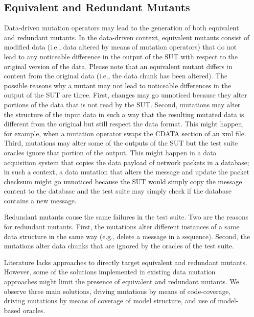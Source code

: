 
\subsection{Equivalent and Redundant Mutants}
\label{sec:dataequivalent}

Data-driven mutation operators may lead to the generation of both equivalent and redundant mutants.
In the data-driven context, equivalent mutants consist of modified data (i.e., data altered by means of mutation operators) that do not lead to any noticeable difference in the output of the SUT with respect to the original version of the data.
Please note that an equivalent mutant differs in content from the original data (i.e., the data chunk has been altered).
The possible reasons why a mutant may not lead to noticeable differences in the output of the SUT are three. First, changes may go unnoticed because they alter portions of the data that is not read by the SUT. Second,  mutations may alter the structure of the input data in such a way that the resulting mutated data is different from the original but still respect the data format. This might happen, for example, when a mutation operator swaps the CDATA section of an xml file. Third, mutations may alter some of the outputs of the SUT but the test suite oracles ignore that portion of the output. This might happen in a data acquisition system that copies the data payload of network packets in a database; in such a context, a data mutation that alters the message and update the packet checksum might go unnoticed because the SUT would simply copy the message content to the database and the test suite may simply check if the database contains a new message.

Redundant mutants cause the same failures in the test suite. Two are the reasons for redundant mutants. First, the mutations alter different instances of a same data structure in the same way (e.g., delete a message in a sequence). Second, the mutations alter data chunks that are ignored by the oracles of the test suite.

Literature lacks approaches to directly target equivalent and redundant mutants. However, some of the solutions implemented in existing data mutation approaches might limit the presence of equivalent and redundant mutants. We observe three main solutions, driving mutations by means of code-coverage, driving mutations by means of coverage of model structure, and use of model-based oracles.

